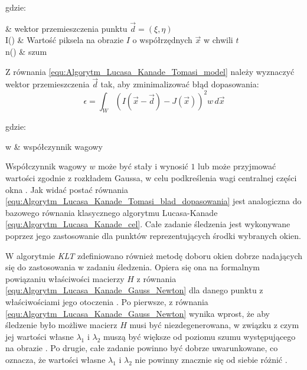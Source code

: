 \noindent
gdzie:
\begin{conditions}
	 & wektor przemieszczenia punktu $\vec{d} = (\xi, \eta)$ \\
	I() & Wartość piksela na obrazie $I$ o współrzędnych $\vec{x}$ w chwili $t$ \\
	n() & szum \\
\end{conditions}

Z równania \ref{equ:Algorytm_Lucasa_Kanade_Tomasi_model} należy wyznaczyć wektor przemieszczenia $\vec{d}$ tak, aby zminimalizować błąd dopasowania:
\begin{equation}
\label{equ:Algorytm_Lucasa_Kanade_Tomasi_blad_dopasowania}
	\epsilon = \int_W (I(\vec{x} - \vec{d}) - J(\vec{x}))^2 w \, d\vec{x}
\end{equation}

\noindent
gdzie:
\begin{conditions}
	w & współczynnik wagowy \\
\end{conditions}

Współczynnik wagowy $w$ może być stały i wynosić $1$ lub może przyjmować wartości zgodnie z rozkładem Gaussa, w celu podkreślenia wagi centralnej części okna \cite{Tomasi1991}. Jak widać postać równania \ref{equ:Algorytm_Lucasa_Kanade_Tomasi_blad_dopasowania} jest analogiczna do bazowego równania klasycznego algorytmu Lucasa-Kanade \ref{equ:Algorytm_Lucasa_Kanade_cel}. Całe zadanie śledzenia jest wykonywane poprzez jego zastosowanie dla punktów reprezentujących środki wybranych okien.

W algorytmie \textit{KLT} zdefiniowano również metodę doboru okien dobrze nadających się do zastosowania w zadaniu śledzenia. Opiera się ona na formalnym powiązaniu właściwości macierzy $H$ z równania \ref{equ:Algorytm_Lucasa_Kanade_Gauss_Newton} dla danego punktu z właściwościami jego otoczenia \cite{Tomasi1991}. Po pierwsze, z równania \ref{equ:Algorytm_Lucasa_Kanade_Gauss_Newton} wynika wprost, że aby śledzenie było możliwe macierz $H$ musi być niezdegenerowana, w związku z czym jej wartości własne $\lambda_1$ i $\lambda_2$ muszą być większe od poziomu szumu występującego na obrazie \cite{Tomasi1991}. Po drugie, całe zadanie powinno być dobrze uwarunkowane, co oznacza, że wartości własne $\lambda_1$ i $\lambda_2$ nie powinny znacznie się od siebie różnić \cite{Tomasi1991}.

